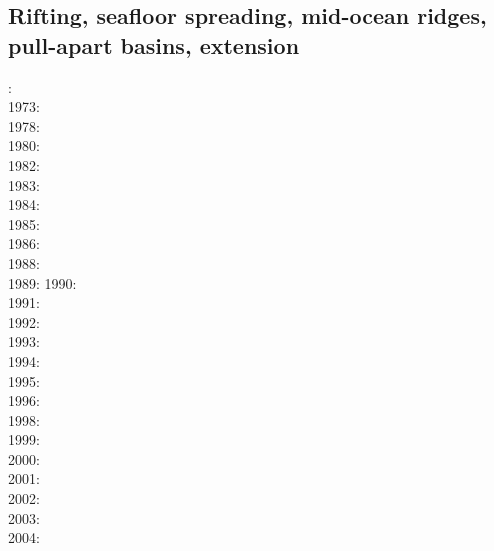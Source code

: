 \subsection{Rifting, seafloor spreading, mid-ocean ridges, pull-apart basins, extension}

{\scriptsize
{}: \cite{lath72}\\
1973: \cite{froi73}\\
1978: \cite{stei78}\cite{mcke78}\\
1980: \cite{bran80}\\
1982: \cite{bekb82}\\
1983: \cite{engl83}\\
1984: \cite{poay84}\\
1985: \cite{bosw85}\\
1986: \cite{hoen86b}\cite{zupf86}\cite{zupa86}\cite{mofr86}\cite{mcke86}\cite{buck86}\\
1988: \cite{bums88}\\
1989: \cite{mewi89}\cite{brbe89}\cite{ismb89}\cite{soen89}\cite{brbe89b}\cite{brbe89c}
1990: \cite{fara90}\cite{lipa90}\cite{mccl90}\cite{chmo90}\cite{chmo90b}\\
1991: \cite{trbr91}\cite{buck91}\\
1992: \cite{zieg92b}\cite{egan92}\\
1993: \cite{gowo93}\\
1994: \cite{trca94}\cite{jhpp94}\\
1995: \cite{gowo95}\cite{katl95}\\
1996: \cite{dusa96}\cite{beda96}\cite{mada96}\\
1998: \cite{rafm98}\\
1999: \cite{brun99}\cite{bulp99}\cite{gowo99}\\
2000: \cite{scth00}\\
2001: \cite{hupc01}\cite{hupc01b}\cite{frbr01}\cite{frnb01a}\cite{frnb01b}\\
2002: \cite{hube02}\cite{hani02}\cite{dabm02}\cite{vacl02}\cite{belz02}\cite{hupc02}
      \cite{hube02b}\cite{vacl02}\cite{labu02}\\
2003: \cite{hube03}\cite{hani03}\cite{covb03}\cite{wibm03}\\
2004: \cite{hier04}\cite{sees04}\\
}
